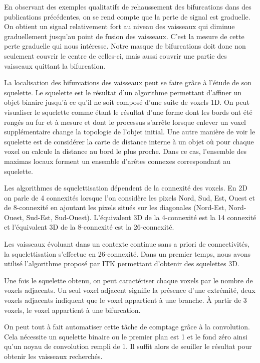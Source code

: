 En observant des exemples qualitatifs de rehaussement des bifurcations dans des publications précédentes, on se rend compte que la perte de signal est graduelle. On obtient un signal relativement fort au niveau des vaisseaux qui diminue graduellement jusqu'au point de fusion des vaisseaux. C'est la mesure de cette perte graduelle qui nous intéresse. Notre masque de bifurcations doit donc non seulement couvrir le centre de celles-ci, mais aussi couvrir une partie des vaisseaux quittant la bifurcation.

La localisation des bifurcations des vaisseaux peut se faire grâce à l'étude de son squelette. Le squelette est le résultat d'un algorithme permettant d'affiner un objet binaire jusqu'à ce qu'il ne soit composé d'une suite de voxels 1D. On peut visualiser le squelette comme étant le résultat d'une forme dont les bords ont été rongés au fur et à mesure et dont le processus s'arrête lorsque enlever un voxel supplémentaire change la topologie de l'objet initial. Une autre manière de voir le squelette est de considérer la carte de distance interne à un objet où pour chaque voxel on calcule la distance au bord le plus proche. Dans ce cas, l'ensemble des maximas locaux forment un ensemble d'arêtes connexes correspondant au squelette.

Les algorithmes de squelettisation dépendent de la connexité des voxels. En 2D on parle de 4 connexités lorsque l'on considère les pixels Nord, Sud, Est, Ouest et de 8-connexité en ajoutant les pixels situés sur les diagonales (Nord-Est, Nord-Ouest, Sud-Est, Sud-Ouest). L'équivalent 3D de la 4-connexité est la 14 connexité et l'équivalent 3D de la 8-connexité est la 26-connexité.

Les vaisseaux évoluant dans un contexte continue sans a priori de connectivités, la squelettisation s'effectue en 26-connexité. Dans un premier temps, nous avons utilisé l'algorithme proposé par ITK permettant d'obtenir des squelettes 3D.

Une fois le squelette obtenu, on peut caractériser chaque voxels par le nombre de voxels adjacents. Un seul voxel adjacent signifie la présence d'une extrémité, deux voxels adjacents indiquent que le voxel appartient à une branche. À partir de 3 voxels, le voxel appartient à une bifurcation.

On peut tout à fait automatiser cette tâche de comptage grâce à la convolution. Cela nécessite un squelette binaire ou le premier plan est 1 et le  fond zéro ainsi qu'un noyau de convolution rempli de 1. Il suffit alors de seuiller le résultat pour obtenir les vaisseaux recherchés.

